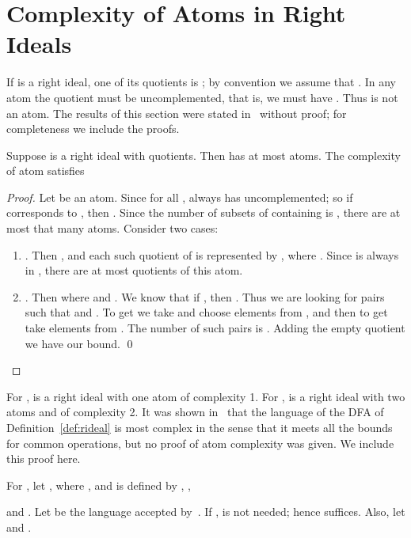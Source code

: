 \documentclass{llncs}
\newcommand{\be}{\begin{enumerate}}
\newcommand{\ee}{\end{enumerate}}
\begin{document}
\section{Complexity of Atoms in Right Ideals}


If  is a right ideal, one of its quotients is ; by convention we assume that . In any atom  the quotient  must be uncomplemented, that is, we must have . Thus  is not an atom.
The results of this section were stated in~\cite{BrDa14} without proof; for completeness we include the proofs.
\begin{proposition}
\label{prop:bounds_right}
Suppose  is a right ideal with  quotients. Then  has at most  atoms.
The  complexity  of atom  satisfies


\end{proposition}
\begin{proof}
Let  be an atom.
Since  for all ,  always has  uncomplemented; so if  corresponds to , then .
Since the number of subsets  of  containing  is , there are at most that many atoms. Consider two cases:
\be
\item
.
Then  , and each such quotient of  is represented by , where .
Since  is always in , there are at most  quotients of this atom.
\item
. Then   where  and .
We know that if , then . 
Thus we are looking for pairs  such that  and .
To get  we take  and choose  elements from , and then to get  take  elements from .
The number of such pairs is
.
Adding the empty quotient we have our bound. \qed
\ee

\end{proof}

For ,  is a right ideal with one atom of complexity 1. 
For ,  is a right ideal with two atoms  and  of complexity 2.
It was shown in~\cite{BrDa14} that the language of the DFA of Definition~\ref{def:rideal} is most complex in the sense that it meets all the bounds for common operations, but no proof of atom complexity was given. We include this proof here.


\begin{definition}
\label{def:rideal}
For , let , where 
, 
and  is defined by
,
,

and .
Let  be the language accepted by~.
If ,  is not needed; hence  suffices.
Also, let  and . 
\end{definition}
\end{document}

